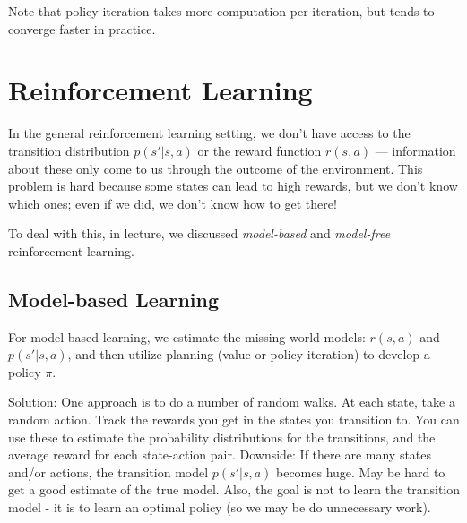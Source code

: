 \documentclass[12pt]{article}
\begin{document}
Note that policy iteration takes more computation per iteration, but tends to converge faster in practice.


\section{Reinforcement Learning}

In the general reinforcement learning setting, we don't have access to the transition distribution $p(s'|s,a)$ or the reward function $r(s,a)$ --- information about these only come to us through the outcome of the environment. 
This problem is hard because some states can lead to high rewards, but we don't know which ones; even if we did, we don't know how to get there!

To deal with this, in lecture, we discussed \textit{model-based} and \textit{model-free} reinforcement learning. 


\subsection{Model-based Learning}

For model-based learning, we estimate the missing world models: $r(s, a)$ and $p(s'|s, a)$, and then utilize planning (value or policy iteration) to develop a policy $\pi$.


\vspace{1pc}


\vspace{.5pc}

\noindent {}

\vspace{.5pc}

\begin{solution}
\noindent Solution: One approach is to do a number of random walks. At each state, take a random action. Track the rewards you get in the states you transition to. You can use these to estimate the probability distributions for the transitions, and the average reward for each state-action pair. Downside: If there are many states and/or actions, the transition model $p(s'|s,a)$ becomes huge. May be hard to get a good estimate of the true model. Also, the goal is not to learn the transition model - it is to learn an optimal policy (so we may be do unnecessary work).
\end{solution}
\vspace{10cm}
\end{document}
